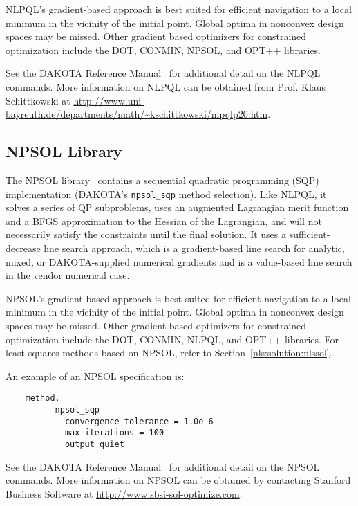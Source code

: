 NLPQL's gradient-based approach is best suited for efficient
navigation to a local minimum in the vicinity of the initial point.
Global optima in nonconvex design spaces may be missed. Other gradient
based optimizers for constrained optimization include the DOT, CONMIN,
NPSOL, and OPT++ libraries.

See the DAKOTA Reference Manual~\cite{RefMan} for additional detail on
the NLPQL commands. More information on NLPQL can be obtained from
Prof. Klaus Schittkowski at
\url{http://www.uni-bayreuth.de/departments/math/~kschittkowski/nlpqlp20.htm}.

\subsection{NPSOL Library}\label{opt:software:npsol}

The NPSOL library~\cite{Gil86} contains a sequential quadratic
programming (SQP) implementation (DAKOTA's \texttt{npsol\_sqp} method
selection).  Like NLPQL, it solves a series of QP subproblems, uses an
augmented Lagrangian merit function and a BFGS approximation to the
Hessian of the Lagrangian, and will not necessarily satisfy the
constraints until the final solution.  It uses a sufficient-decrease
line search approach, which is a gradient-based line search for
analytic, mixed, or DAKOTA-supplied numerical gradients and is a
value-based line search in the vendor numerical case.

NPSOL's gradient-based approach is best suited for efficient
navigation to a local minimum in the vicinity of the initial point.
Global optima in nonconvex design spaces may be missed. Other gradient
based optimizers for constrained optimization include the DOT, CONMIN,
NLPQL, and OPT++ libraries. For least squares methods based on NPSOL,
refer to Section~\ref{nls:solution:nlssol}.

An example of an NPSOL specification is:
\begin{small}
\begin{verbatim}
    method,
          npsol_sqp
            convergence_tolerance = 1.0e-6
            max_iterations = 100
            output quiet
\end{verbatim}
\end{small}

See the DAKOTA Reference Manual~\cite{RefMan} for additional detail on the
NPSOL commands. More information on NPSOL can be obtained by
contacting Stanford Business Software at \url{http://www.sbsi-sol-optimize.com}.

